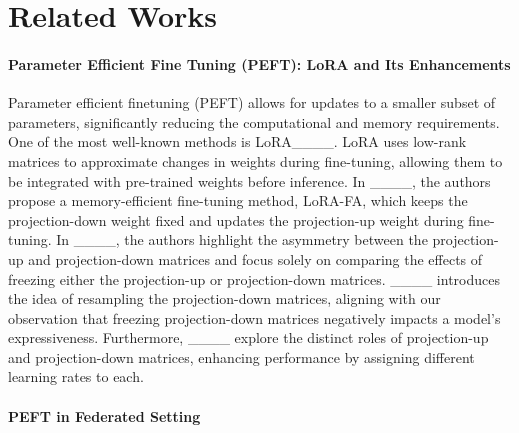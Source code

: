 \section{Related Works}
\label{related-works}
\paragraph{Parameter Efficient Fine Tuning (PEFT): LoRA and Its Enhancements}
 Parameter efficient finetuning (PEFT) allows for updates to a smaller subset of parameters, significantly reducing the computational and memory requirements. One of the most well-known methods is LoRA____.
LoRA uses low-rank matrices to approximate changes in weights during fine-tuning, allowing them to be integrated with pre-trained weights before inference. In ____, the authors propose a memory-efficient fine-tuning method, LoRA-FA, which keeps the projection-down weight fixed and updates the projection-up weight during fine-tuning. In ____, the authors highlight the asymmetry between the projection-up and projection-down matrices and focus solely on comparing the effects of freezing either the projection-up or projection-down matrices. ____ introduces the idea of resampling the projection-down matrices, aligning with our observation that freezing projection-down matrices negatively impacts a model's expressiveness. Furthermore, ____ explore the distinct roles of projection-up and projection-down matrices, enhancing performance by assigning different learning rates to each. 
\paragraph{PEFT in Federated Setting}

